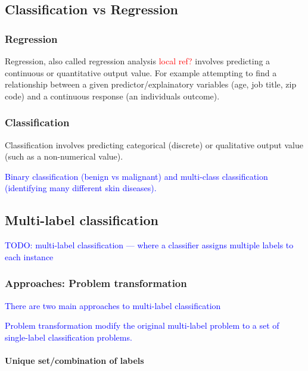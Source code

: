 \subsection{Classification vs Regression}

\subsubsection{Regression} 

Regression, also called regression analysis \textcolor{red}{local ref?} involves predicting a continuous or quantitative output value. For example attempting to find a relationship between a given predictor/explainatory variables (age, job title, zip code) and a continuous response (an individuals outcome).

\subsubsection{Classification} 

Classification involves predicting categorical (discrete) or qualitative output value (such as a non-numerical value). 

\textcolor{blue}{Binary classification (benign vs malignant) and multi-class classification (identifying many different skin diseases).}

\subsection{Multi-label classification}
\textcolor{blue}{TODO: {multi-label classification} --- where a classifier assigns multiple labels to each instance}


\subsubsection{Approaches: Problem transformation}

\textcolor{blue}{There are two main approaches to multi-label classification}

\textcolor{blue}{{Problem transformation} modify the original multi-label problem to a set of single-label classification problems.}

\paragraph{Unique set/combination of labels}

